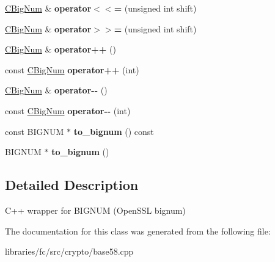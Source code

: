 \begin{DoxyCompactItemize}
\item 
\mbox{\label{class_c_big_num_a784951e3a24199fa6b994a951453d156}} 
\mbox{\hyperlink{class_c_big_num}{C\+Big\+Num}} \& {\bfseries operator$<$$<$=} (unsigned int shift)
\item 
\mbox{\label{class_c_big_num_a7d2759e104a02502891b185dfb704ad1}} 
\mbox{\hyperlink{class_c_big_num}{C\+Big\+Num}} \& {\bfseries operator$>$$>$=} (unsigned int shift)
\item 
\mbox{\label{class_c_big_num_ac9421f22614796d8520be7e6ade71ee8}} 
\mbox{\hyperlink{class_c_big_num}{C\+Big\+Num}} \& {\bfseries operator++} ()
\item 
\mbox{\label{class_c_big_num_aa69e12c7f330374b2d86df0da0627e58}} 
const \mbox{\hyperlink{class_c_big_num}{C\+Big\+Num}} {\bfseries operator++} (int)
\item 
\mbox{\label{class_c_big_num_a47920287946fb3a55e84af70e953e78f}} 
\mbox{\hyperlink{class_c_big_num}{C\+Big\+Num}} \& {\bfseries operator-\/-\/} ()
\item 
\mbox{\label{class_c_big_num_a13d365561d5407fc624eacb6378db4d3}} 
const \mbox{\hyperlink{class_c_big_num}{C\+Big\+Num}} {\bfseries operator-\/-\/} (int)
\item 
\mbox{\label{class_c_big_num_ada3a3cb24f627ba51d5e93065f4665dd}} 
const B\+I\+G\+N\+UM $\ast$ {\bfseries to\+\_\+bignum} () const
\item 
\mbox{\label{class_c_big_num_a23b2a54aa1e6e9e01b155b45cecd7610}} 
B\+I\+G\+N\+UM $\ast$ {\bfseries to\+\_\+bignum} ()
\end{DoxyCompactItemize}


\subsection{Detailed Description}
C++ wrapper for B\+I\+G\+N\+UM (Open\+S\+SL bignum) 

The documentation for this class was generated from the following file\+:\begin{DoxyCompactItemize}
\item 
libraries/fc/src/crypto/base58.\+cpp\end{DoxyCompactItemize}
